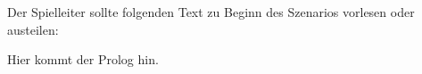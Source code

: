 

\begin{center}\vfill
Der Spielleiter sollte folgenden Text zu Beginn des Szenarios vorlesen oder austeilen:
\vfill\end{center}

\begin{multicols}{2}\itshape

Hier kommt der Prolog hin.

\lipsum[1-6]

\end{multicols}

\newpage